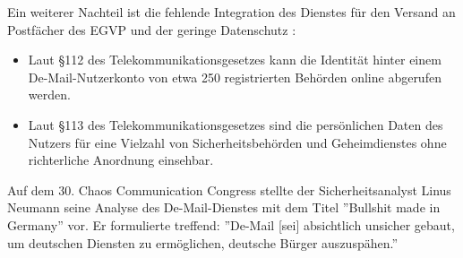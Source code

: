 Ein weiterer Nachteil ist die fehlende Integration des Dienstes für den Versand an Postfächer des EGVP und der geringe Datenschutz \cite{bea:demail}:
\begin{itemize}
	\item Laut §112 des Telekommunikationsgesetzes kann die Identität hinter einem De-Mail-Nutzerkonto von etwa 250 registrierten Behörden online abgerufen werden.
	\item Laut §113 des Telekommunikationsgesetzes sind die persönlichen Daten des Nutzers für eine Vielzahl von Sicherheitsbehörden und Geheimdienstes ohne richterliche Anordnung einsehbar.
\end{itemize}

Auf dem 30. Chaos Communication Congress stellte der Sicherheitsanalyst Linus Neumann seine Analyse des De-Mail-Dienstes mit dem Titel ''Bullshit made in Germany'' vor. Er formulierte treffend: ''De-Mail [sei] absichtlich unsicher gebaut, um deutschen Diensten zu ermöglichen, deutsche Bürger auszuspähen.''\cite{bea:demail:bullshit}
 